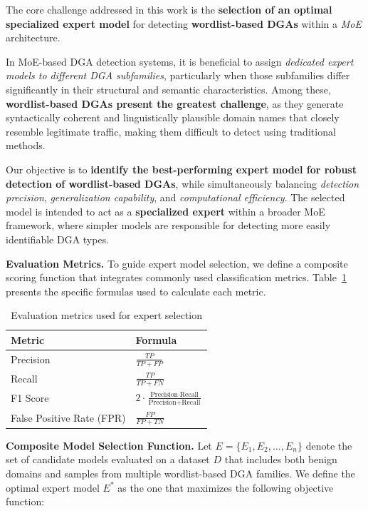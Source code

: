 \documentclass[a4paper]{llncs}
\begin{document}
The core challenge addressed in this work is the \textbf{selection of an optimal specialized expert model} for detecting \textbf{wordlist-based DGAs} within a \textit{MoE} architecture.

In MoE-based DGA detection systems, it is beneficial to assign \textit{dedicated expert models to different DGA subfamilies}, particularly when those subfamilies differ significantly in their structural and semantic characteristics. Among these, \textbf{wordlist-based DGAs present the greatest challenge}, as they generate syntactically coherent and linguistically plausible domain names that closely resemble legitimate traffic, making them difficult to detect using traditional methods.

Our objective is to \textbf{identify the best-performing expert model for robust detection of wordlist-based DGAs}, while simultaneously balancing \textit{detection precision}, \textit{generalization capability}, and \textit{computational efficiency}. The selected model is intended to act as a \textbf{specialized expert} within a broader MoE framework, where simpler models are responsible for detecting more easily identifiable DGA types.

\textbf{Evaluation Metrics.} To guide expert model selection, we define a composite scoring function that integrates commonly used classification metrics. Table~\ref{tab:metrics} presents the specific formulas used to calculate each metric.

\begin{table}[h]
\centering
\caption{Evaluation metrics used for expert selection}
\label{tab:metrics}
\small %
\renewcommand{\arraystretch}{1.5} %
\begin{tabular}{ll}
\toprule
\textbf{Metric} & \textbf{Formula} \\
\midrule
Precision & $\textstyle \frac{TP}{TP + FP}$ \\
Recall  & $\textstyle \frac{TP}{TP + FN}$ \\
F1 Score & $\textstyle 2 \cdot \frac{\text{Precision} \cdot \text{Recall}}{\text{Precision} + \text{Recall}}$ \\
False Positive Rate (FPR) & $\textstyle \frac{FP}{FP + TN}$ \\
\bottomrule
\end{tabular}
\end{table}



\textbf{Composite Model Selection Function.} Let $E = \{E_1, E_2, \ldots, E_n\}$ denote the set of candidate models evaluated on a dataset $D$ that includes both benign domains and samples from multiple wordlist-based DGA families. We define the optimal expert model $E^*$ as the one that maximizes the following objective function:
\end{document}
